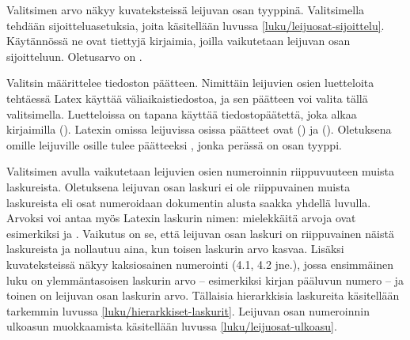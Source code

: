 
\begin{esimerkki*}

\begin{koodilohko}
\end{koodilohko}

\caption{\-/ komennon käyttö}
\label{esim/declarenewfloat}
\end{esimerkki*}

Valitsimen  arvo näkyy kuvateksteissä leijuvan osan
tyyppinä. Valitsimella  tehdään sijoitteluasetuksia,
joita käsitellään luvussa \ref{luku/leijuosat-sijoittelu}. Käytännössä
ne ovat tiettyjä kirjaimia, joilla vaikutetaan leijuvan osan
sijoitteluun. Oletusarvo on .

Valitsin  määrittelee tiedoston päätteen. Nimittäin
leijuvien osien luetteloita tehtäessä Latex käyttää väliaikaistiedostoa,
ja sen päätteen voi valita tällä valitsimella. Luetteloissa on tapana
käyttää tiedostopäätettä, joka alkaa kirjaimilla 
(). Latexin omissa leijuvissa osissa päätteet ovat
 () ja  (). Oletuksena omille leijuville osille tulee päätteeksi
, jonka perässä on osan tyyppi.

Valitsimen  avulla vaikutetaan leijuvien osien numeroinnin
riippuvuuteen muista laskureista. Oletuksena leijuvan osan laskuri ei
ole riippuvainen muista laskureista eli osat numeroidaan dokumentin
alusta saakka yhdellä luvulla. Arvoksi voi antaa myös Latexin laskurin
nimen: mielekkäitä arvoja ovat esimerkiksi  ja
. Vaikutus on se, että leijuvan osan laskuri on
riippuvainen näistä laskureista ja nollautuu aina, kun toisen laskurin
arvo kasvaa. Lisäksi kuvateksteissä näkyy kaksiosainen numerointi (4.1,
4.2 jne.), jossa ensimmäinen luku on ylemmäntasoisen laskurin arvo --
esimerkiksi kirjan pääluvun numero -- ja toinen on leijuvan osan
laskurin arvo. Tällaisia hierarkkisia laskureita käsitellään tarkemmin
luvussa \ref{luku/hierarkkiset-laskurit}. Leijuvan osan numeroinnin
ulkoasun muokkaamista käsitellään luvussa \ref{luku/leijuosat-ulkoasu}.

